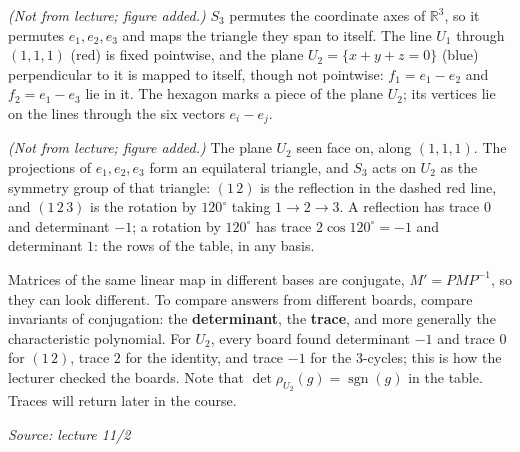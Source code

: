 \documentclass[11pt]{report}
\newcommand{\sgn}{\operatorname{sgn}}
\newcommand{\srcline}[1]{\par\hfill{\footnotesize\textit{Source: #1}}}
\begin{document}
\textit{(Not from lecture; figure added.)} $S_3$ permutes the coordinate axes of $\mathbb{R}^3$, so it permutes $e_1, e_2, e_3$ and maps the triangle they span to itself. The line $U_1$ through $(1,1,1)$ (red) is fixed pointwise, and the plane $U_2 = \{x + y + z = 0\}$ (blue) perpendicular to it is mapped to itself, though not pointwise: $f_1 = e_1 - e_2$ and $f_2 = e_1 - e_3$ lie in it. The hexagon marks a piece of the plane $U_2$; its vertices lie on the lines through the six vectors $e_i - e_j$.

\begin{center}
\end{center}

\textit{(Not from lecture; figure added.)} The plane $U_2$ seen face on, along $(1,1,1)$. The projections of $e_1, e_2, e_3$ form an equilateral triangle, and $S_3$ acts on $U_2$ as the symmetry group of that triangle: $(1\,2)$ is the reflection in the dashed red line, and $(1\,2\,3)$ is the rotation by $120^\circ$ taking $1 \to 2 \to 3$. A reflection has trace $0$ and determinant $-1$; a rotation by $120^\circ$ has trace $2\cos 120^\circ = -1$ and determinant $1$: the rows of the table, in any basis.

\begin{rembox}\label{rem:checking-bases}
Matrices of the same linear map in different bases are conjugate, $M' = PMP^{-1}$, so they can look different. To compare answers from different boards, compare invariants of conjugation: the \textbf{determinant}, the \textbf{trace}, and more generally the characteristic polynomial. For $U_2$, every board found determinant $-1$ and trace $0$ for $(1\,2)$, trace $2$ for the identity, and trace $-1$ for the $3$-cycles; this is how the lecturer checked the boards. Note that $\det \rho_{U_2}(g) = \sgn(g)$ in the table. Traces will return later in the course.
\srcline{lecture 11/2}
\end{rembox}
\end{document}
